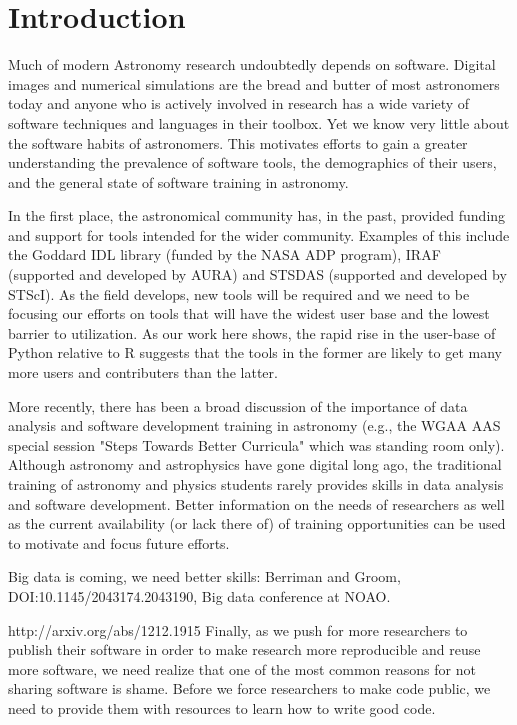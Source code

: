 \section{Introduction}

Much of modern Astronomy research undoubtedly depends on software. Digital images and numerical simulations are the bread and butter of most astronomers today and anyone who is actively involved in research has a wide variety of software techniques and languages in their toolbox. Yet we know very little about the software habits of astronomers. This motivates efforts to gain a greater understanding the prevalence of software tools, the demographics of their users, and the general state of software training in astronomy.

In the first place, the astronomical community has, in the past, provided funding and support for tools intended for the wider community. Examples of this include the Goddard IDL library (funded by the NASA ADP program), IRAF (supported and developed by AURA) and STSDAS (supported and developed by STScI). As the field develops, new tools will be required and we need to be focusing our efforts on tools that will have the widest user base and the lowest barrier to utilization. As our work here shows, the rapid rise in the user-base of Python relative to R suggests that the tools in the former are likely to get many more users and contributers than the latter. 

More recently, there has been a broad discussion of the importance of data analysis and software development training in astronomy (e.g., the WGAA AAS special session "Steps Towards Better Curricula" which was standing room only). Although astronomy and astrophysics have gone digital long ago, the traditional training of astronomy and physics students rarely provides skills in data analysis and software development. Better information on the needs of researchers as well as the current availability (or lack there of) of training opportunities can be used to motivate and focus future efforts. 

Big data is coming, we need better skills: Berriman and Groom, DOI:10.1145/2043174.2043190, Big data conference at NOAO.

http://arxiv.org/abs/1212.1915
Finally, as we push for more researchers to publish their software in order to make research more reproducible and reuse more software, we need realize that one of the most common reasons for not sharing software is shame. Before we force researchers to make code public, we need to provide them with resources to learn how to write good code. 


